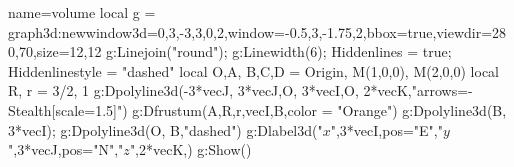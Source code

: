 \documentclass[12pt]{standalone}
\begin{document}
\begin{luadraw}{name=volume}
local g = graph3d:new{window3d={0,3,-3,3,0,2},window={-0.5,3,-1.75,2},bbox=true,viewdir={280,70},size={12,12}}
g:Linejoin("round"); g:Linewidth(6); Hiddenlines = true; Hiddenlinestyle = "dashed"
local O,A, B,C,D = Origin, M(1,0,0), M(2,0,0)
local R, r = 3/2, 1
g:Dpolyline3d({{-3*vecJ, 3*vecJ},{O, 3*vecI},{O, 2*vecK}},"arrows={-Stealth[scale=1.5]}")
g:Dfrustum(A,R,r,vecI,B,{color = "Orange"})
g:Dpolyline3d({B, 3*vecI}); g:Dpolyline3d({O, B},"dashed")
g:Dlabel3d("$x$",3*vecI,{pos="E"},"$y$",3*vecJ,{pos="N"},"$z$",2*vecK,{})
g:Show()
\end{luadraw}
\end{document}
